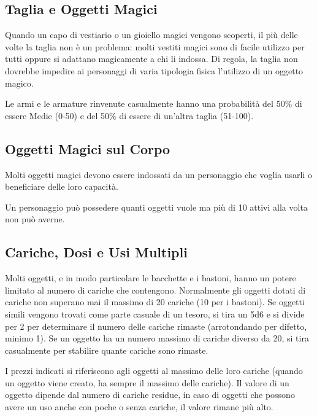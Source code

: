 \documentclass[12pt,a4paper,twoside,openany]{book}
\begin{document}
\begin{multicols}{2}
\begin{itemize}
\end{itemize}

\subsection{Taglia e Oggetti Magici}\label{tagliaoggettimagici}

\label{taglia-e-oggetti-magici}

Quando un capo di vestiario o un gioiello magici vengono scoperti, il più delle volte la taglia non è un problema: molti vestiti magici sono di facile utilizzo per tutti oppure si adattano magicamente a chi li indossa. Di regola, la taglia non dovrebbe impedire ai personaggi di varia tipologia fisica l'utilizzo di un oggetto magico.

Le armi e le armature rinvenute casualmente hanno una probabilità del 50\% di essere Medie (0-50) e del 50\% di essere di un'altra taglia (51-100).

\subsection{Oggetti Magici sul Corpo}

\label{oggetti-magici-sul-corpo}

Molti oggetti magici devono essere indossati da un personaggio che voglia usarli o beneficiare delle loro capacità. 

Un personaggio può possedere quanti oggetti vuole ma più di 10 attivi alla volta non può averne.

\subsection{Cariche, Dosi e Usi Multipli}

\label{cariche-dosi-e-usi-multipli}

Molti oggetti, e in modo particolare le bacchette e i bastoni, hanno un potere limitato al numero di cariche che contengono. Normalmente gli oggetti dotati di cariche non superano mai il massimo di 20 cariche (10 per i bastoni). Se oggetti simili vengono trovati come parte casuale di un tesoro, si tira un 5d6 e si divide per 2 per determinare il numero delle cariche rimaste (arrotondando per difetto, minimo 1). Se un oggetto ha un numero massimo di cariche diverso da 20, si tira casualmente per stabilire quante cariche sono rimaste.

I prezzi indicati si riferiscono agli oggetti al massimo delle loro cariche (quando un oggetto viene creato, ha sempre il massimo delle cariche). Il valore di un oggetto dipende dal numero di cariche residue, in caso di oggetti che possono avere un uso anche con poche o senza cariche, il valore rimane più alto.

\end{multicols}
\end{document}

